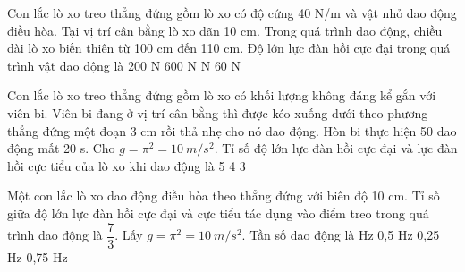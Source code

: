 \begin{vidu}%
Con lắc lò xo treo thẳng đứng gồm lò xo có độ cứng 40 N/m và vật nhỏ dao động điều hòa. Tại vị trí cân bằng lò xo dãn 10 cm. Trong quá trình dao động, chiều dài lò xo biến thiên từ 100 cm đến 110 cm. Độ lớn lực đàn hồi cực đại trong quá trình vật dao động là
\choice
{200 N}
{600 N}
{ N}
{60 N}
\end{vidu} %
\begin{vidu}%
Con lắc lò xo treo thẳng đứng gồm lò xo có khối lượng không đáng kể gắn với viên bi. Viên bi đang ở vị trí cân bằng thì được kéo xuống dưới theo phương thẳng đứng một đoạn 3 cm rồi thả nhẹ cho nó dao động. Hòn bi thực hiện 50 dao động mất 20 s. Cho $g = \pi^2 = 10\ m/s^2$. Tỉ số độ lớn lực đàn hồi cực đại và lực đàn hồi cực tiểu của lò xo khi dao động là
\choice
{5}
{4}
{}
{3}
\end{vidu} %
\begin{vidu}%
Một con lắc lò xo dao động điều hòa theo thẳng đứng với biên độ 10 cm. Tỉ số giữa độ lớn lực đàn hồi cực đại và cực tiểu tác dụng vào điểm treo trong quá trình dao động là $\dfrac{7}{3}$. Lấy $g = \pi^2 = 10\ m/s^2$. Tần số dao động là
\choice
{ Hz}
{0,5 Hz}
{0,25 Hz}
{0,75 Hz}
\end{vidu} %

